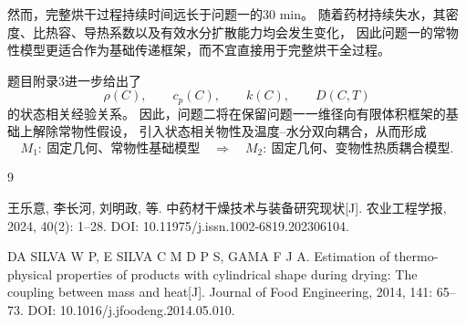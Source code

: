 \documentclass[UTF8,a4paper,12pt]{ctexart}
\begin{document}
然而，完整烘干过程持续时间远长于问题一的30 min。
随着药材持续失水，其密度、比热容、导热系数以及有效水分扩散能力均会发生变化，
因此问题一的常物性模型更适合作为基础传递框架，而不宜直接用于完整烘干全过程。

题目附录3进一步给出了
\begin{equation}
\rho(C),\qquad
c_p(C),\qquad
k(C),\qquad
D(C,T)
\end{equation}
的状态相关经验关系。
因此，问题二将在保留问题一一维径向有限体积框架的基础上解除常物性假设，
引入状态相关物性及温度--水分双向耦合，从而形成
\begin{equation}
\boxed{
M_1:\ \text{固定几何、常物性基础模型}
}
\quad\Longrightarrow\quad
\boxed{
M_2:\ \text{固定几何、变物性热质耦合模型}
}.
\end{equation}

\begin{thebibliography}{9}

王乐意, 李长河, 刘明政, 等.
中药材干燥技术与装备研究现状[J].
农业工程学报, 2024, 40(2): 1--28.
DOI: 10.11975/j.issn.1002-6819.202306104.

DA SILVA W P, E SILVA C M D P S, GAMA F J A.
Estimation of thermo-physical properties of products with cylindrical shape during drying:
The coupling between mass and heat[J].
Journal of Food Engineering, 2014, 141: 65--73.
DOI: 10.1016/j.jfoodeng.2014.05.010.

\end{thebibliography}
\end{document}
